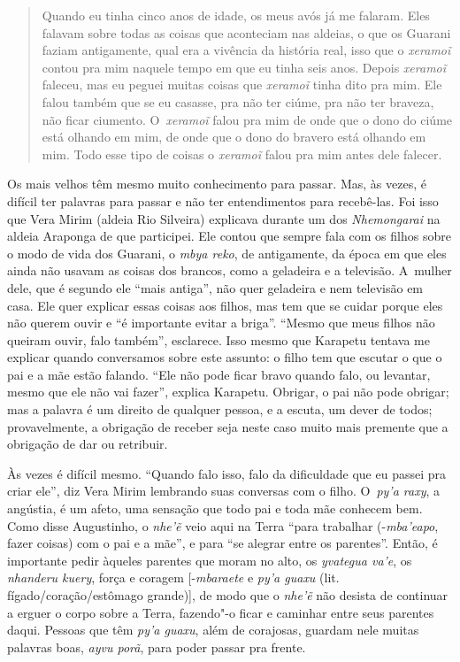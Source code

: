 \begin{quote}
Quando eu tinha cinco anos de idade, os meus avós já me falaram. Eles
falavam sobre todas as coisas que aconteciam nas aldeias, o que os
Guarani faziam antigamente, qual era a vivência da história real, isso
que o \emph{xeramoĩ} contou pra mim naquele tempo em que eu tinha seis
anos. Depois \emph{xeramoĩ} faleceu, mas eu peguei muitas coisas que
\emph{xeramoĩ} tinha dito pra mim. Ele falou também que se eu casasse, pra
não ter ciúme, pra não ter braveza, não ficar ciumento. O~\emph{xeramoĩ}
falou pra mim de onde que o dono do ciúme está olhando em mim, de onde
que o dono do bravero está olhando em mim. Todo esse tipo de coisas o
\emph{xeramoĩ} falou pra mim antes dele falecer.
\end{quote}

Os mais velhos têm mesmo muito conhecimento para passar. Mas, às vezes, é
difícil ter palavras para passar e não ter entendimentos para
recebê-las. Foi isso que Vera Mirim (aldeia Rio Silveira) explicava
durante um dos \emph{Nhemongarai} na aldeia Araponga de que participei. Ele
contou que sempre fala com os filhos sobre o modo de vida dos Guarani,
o \emph{mbya reko}, de antigamente, da época em que eles ainda não usavam as
coisas dos brancos, como a geladeira e a televisão. A~mulher dele, que
é segundo ele ``mais antiga'', não quer geladeira e nem televisão em
casa. Ele quer explicar essas coisas aos filhos, mas tem que se cuidar
porque eles não querem ouvir e ``é importante evitar a briga''. ``Mesmo
que meus filhos não queiram ouvir, falo também'', esclarece. Isso mesmo
que Karapetu tentava me explicar quando conversamos sobre este assunto:
o filho tem que escutar o que o pai e a mãe estão falando. ``Ele não
pode ficar bravo quando falo, ou levantar, mesmo que ele não vai
fazer'', explica Karapetu. Obrigar, o pai não pode obrigar; mas a
palavra é um direito de qualquer pessoa, e a escuta, um dever de todos;
provavelmente, a obrigação de receber seja neste caso muito mais
premente que a obrigação de dar ou retribuir. 

Às vezes é difícil mesmo. ``Quando falo isso, falo da dificuldade que eu
passei pra criar ele'', diz Vera Mirim lembrando suas conversas com o
filho. O~\emph{py’a raxy}, a angústia, é um afeto, uma sensação que todo pai e
toda mãe conhecem bem. Como disse Augustinho, o \emph{nhe’ẽ} veio aqui
na Terra ``para trabalhar (-\emph{mba’eapo}, fazer coisas) com o pai e a mãe'',
e para ``se alegrar entre os parentes''. Então, é importante pedir
àqueles parentes que moram no alto, os \emph{yvategua va’e}, os \emph{nhanderu
kuery}, força e coragem [-\emph{mbaraete} e \emph{py’a guaxu} (lit.
fígado/coração/estômago grande)], de modo que o \emph{nhe’ẽ} não desista
de continuar a erguer o corpo sobre a Terra, fazendo"-o ficar e caminhar
entre seus parentes daqui. Pessoas que têm \emph{py’a guaxu}, além de
corajosas, guardam nele muitas palavras boas, \emph{ayvu porã}, para poder
passar pra frente.


